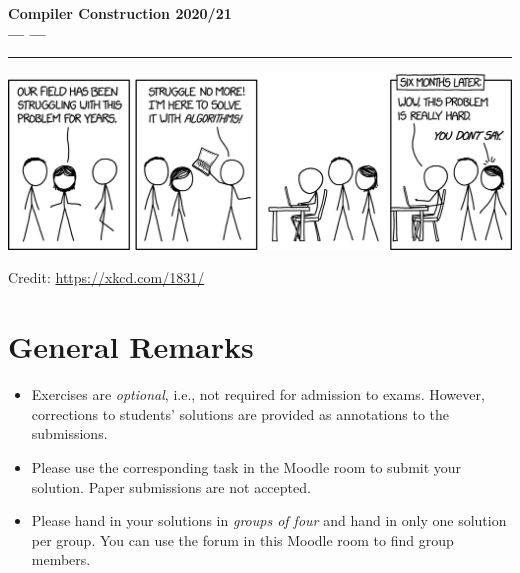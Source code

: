 \documentclass[a4paper]{article}
\begin{document}
\begin{center}
  {\huge \textbf{Compiler Construction 2020/21}}\\
  \vspace*{1\baselineskip}%
  {\huge \textbf{--- \extitle{} \exnumber{} ---}}\\
  \vspace*{1.5\baselineskip}
  \hrule
\end{center}

\begin{onlysolution}
  \begin{center}
    \includegraphics[scale=0.25]{xkcd_algorithms}

    \scriptsize Credit: \href{https://xkcd.com/1831/}{https://xkcd.com/1831/}
  \end{center}
\end{onlysolution}

\section*{General Remarks}
\begin{itemize}
	\item Exercises are \emph{optional}, i.e., not required for admission to exams. However, corrections to students’ solutions are provided as annotations to the submissions.
    \item Please use the corresponding task in the Moodle room to submit your solution. Paper submissions are not accepted.
    \item Please hand in your solutions in \emph{groups of four} and hand in only one solution per group. You can use the forum in this Moodle room to find group members.
\end{itemize}




\end{document}
